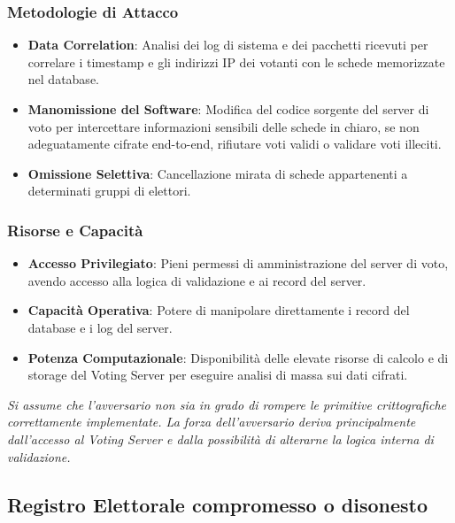 \documentclass[a4paper,12pt]{article}
\begin{document}
\subsubsection*{Metodologie di Attacco}

\begin{itemize}
    \item \textbf{Data Correlation}: Analisi dei log di sistema e dei pacchetti ricevuti per correlare i timestamp e gli indirizzi IP dei votanti con le schede memorizzate nel database.

    \item \textbf{Manomissione del Software}: Modifica del codice sorgente del server di voto per intercettare informazioni sensibili delle schede in chiaro, se non adeguatamente cifrate end-to-end, rifiutare voti validi o validare voti illeciti.

    \item \textbf{Omissione Selettiva}: Cancellazione mirata di schede appartenenti a determinati gruppi di elettori.
\end{itemize}

\subsubsection*{Risorse e Capacità}

\begin{itemize}
    \item \textbf{Accesso Privilegiato}: Pieni permessi di amministrazione del server di voto, avendo accesso alla logica di validazione e ai record del server.

    \item \textbf{Capacità Operativa}: Potere di manipolare direttamente i record del database e i log del server.

    \item \textbf{Potenza Computazionale}: Disponibilità delle elevate risorse di calcolo e di storage del Voting Server per eseguire analisi di massa sui dati cifrati.
\end{itemize}

\textit{Si assume che l'avversario non sia in grado di rompere le primitive crittografiche correttamente implementate. La forza dell'avversario deriva principalmente dall'accesso al Voting Server e dalla possibilità di alterarne la logica interna di validazione.}
\subsection{Registro Elettorale compromesso o disonesto}
\end{document}
